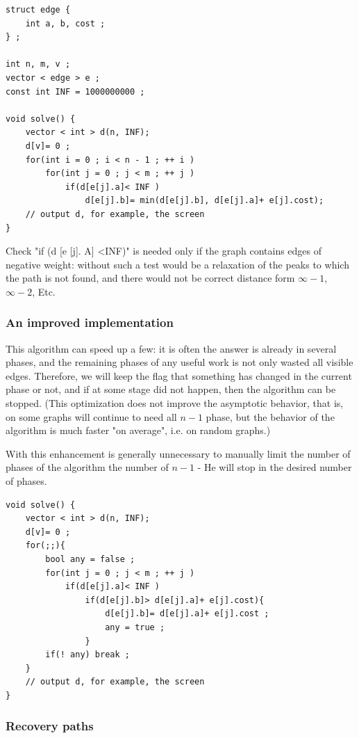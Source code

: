 \begin{verbatim}
struct edge {
    int a, b, cost ;
} ;
 
int n, m, v ;
vector < edge > e ;
const int INF = 1000000000 ;
 
void solve() {
    vector < int > d(n, INF);
    d[v]= 0 ;
    for(int i = 0 ; i < n - 1 ; ++ i )
        for(int j = 0 ; j < m ; ++ j )
            if(d[e[j].a]< INF )
                d[e[j].b]= min(d[e[j].b], d[e[j].a]+ e[j].cost);
    // output d, for example, the screen
} 
\end{verbatim}
Check "if (d [e [j]. A] <INF)" is needed only if the graph contains edges of negative weight: without such a test would be a relaxation of the peaks to which the path is not found, and there would not be correct distance form $\infty - 1$, $\infty - 2$, Etc.

\subsubsection{ An improved implementation }

This algorithm can speed up a few: it is often the answer is already in several phases, and the remaining phases of any useful work is not only wasted all visible edges. Therefore, we will keep the flag that something has changed in the current phase or not, and if at some stage did not happen, then the algorithm can be stopped. (This optimization does not improve the asymptotic behavior, that is, on some graphs will continue to need all $n-1$ phase, but the behavior of the algorithm is much faster "on average", i.e. on random graphs.)

With this enhancement is generally unnecessary to manually limit the number of phases of the algorithm the number of $n-1$ - He will stop in the desired number of phases.

\begin{verbatim}
void solve() {
    vector < int > d(n, INF);
    d[v]= 0 ;
    for(;;){
        bool any = false ;
        for(int j = 0 ; j < m ; ++ j )
            if(d[e[j].a]< INF )
                if(d[e[j].b]> d[e[j].a]+ e[j].cost){
                    d[e[j].b]= d[e[j].a]+ e[j].cost ;
                    any = true ;
                }
        if(! any) break ;
    }
    // output d, for example, the screen
} 
\end{verbatim}
\subsubsection{ Recovery paths }

